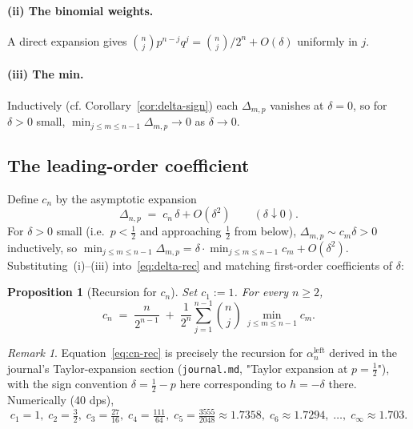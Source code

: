 \documentclass{article}
\newtheorem{proposition}{Proposition}
\theoremstyle{remark}
\newtheorem*{remark}{Remark}
\begin{document}
\paragraph{(ii) The binomial weights.} A direct expansion gives
$\binom{n}{j}p^{n-j}q^{j}=\binom{n}{j}/2^{n}+O(\delta)$ uniformly in
$j$.

\paragraph{(iii) The min.} Inductively (cf. Corollary~\ref{cor:delta-sign})
each $\Delta_{m,p}$ vanishes at $\delta=0$, so for $\delta>0$ small,
$\min_{j\le m\le n-1}\Delta_{m,p}\to 0$ as $\delta\to 0$.

\subsection*{The leading-order coefficient}

Define $c_{n}$ by the asymptotic expansion
\begin{equation}\label{eq:cn-def}
  \Delta_{n,p}\;=\;c_{n}\,\delta+O(\delta^{2})\qquad(\delta\downarrow 0).
\end{equation}
For $\delta>0$ small (i.e.\ $p<\tfrac12$ and approaching $\tfrac12$
from below), $\Delta_{m,p}\sim c_{m}\delta>0$ inductively, so
$\min_{j\le m\le n-1}\Delta_{m,p}=\delta\cdot\min_{j\le m\le n-1}c_{m}+O(\delta^{2})$.
Substituting~(i)--(iii) into~\eqref{eq:delta-rec} and matching
first-order coefficients of $\delta$:

\begin{proposition}[Recursion for $c_{n}$]\label{prop:cn-rec}
Set $c_{1}:=1$. For every $n\ge 2$,
\begin{equation}\label{eq:cn-rec}
  c_{n}\;=\;\frac{n}{2^{n-1}}\;+\;\frac{1}{2^{n}}\sum_{j=1}^{n-1}\binom{n}{j}\,
  \min_{j\le m\le n-1}c_{m}.
\end{equation}
\end{proposition}

\begin{remark}
Equation~\eqref{eq:cn-rec} is precisely the recursion for
$\alpha_{n}^{\text{left}}$ derived in the journal's Taylor-expansion
section (\texttt{journal.md}, "Taylor expansion at $p=\tfrac12$"), with
the sign convention $\delta=\tfrac12-p$ here corresponding to
$h=-\delta$ there. Numerically (40 dps),
\[
  c_{1}=1,\;c_{2}=\tfrac{3}{2},\;c_{3}=\tfrac{27}{16},\;c_{4}=\tfrac{111}{64},\;c_{5}=\tfrac{3555}{2048}\approx 1.7358,\;c_{6}\approx 1.7294,\;\dots,\;c_{\infty}\approx 1.703.
\]
\end{remark}
\end{document}
